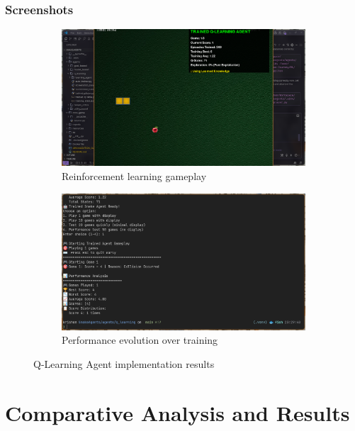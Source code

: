 \documentclass[11pt,a4paper]{article}
\begin{document}
\subsubsection{Screenshots}
\begin{figure}[H]
    \centering
    \begin{subfigure}{0.6\textwidth}
        \includegraphics[width=\textwidth]{ss/learning_play.png}
        \caption{Reinforcement learning gameplay}
    \end{subfigure}
    \hfill
    \begin{subfigure}{0.6\textwidth}
        \includegraphics[width=\textwidth]{ss/learning_score.png}
        \caption{Performance evolution over training}
    \end{subfigure}
    \caption{Q-Learning Agent implementation results}
\end{figure}

\section{Comparative Analysis and Results}
\end{document}
